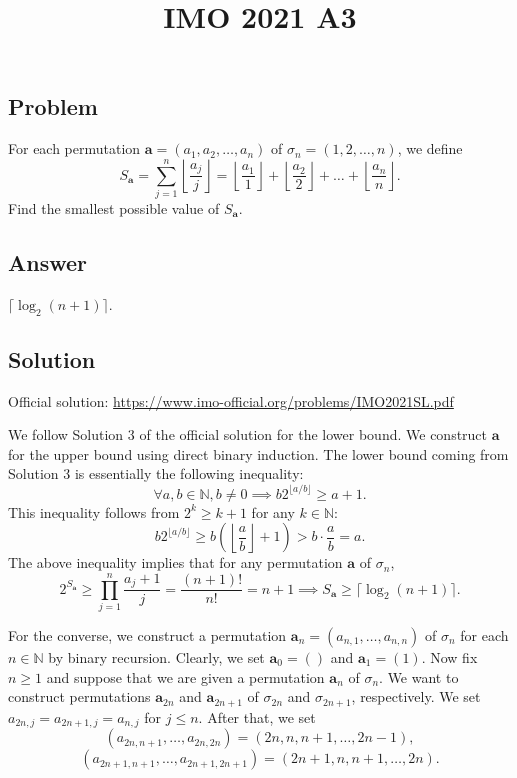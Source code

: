 \documentclass{article}
\title{IMO 2021 A3}
\author{}
\date{}
\newcommand{\N}{\mathbb{N}}
\begin{document}
\maketitle



\subsection*{Problem}

For each permutation $\mathbf{a} = (a_1, a_2, \ldots, a_n)$ of $\sigma_n = (1, 2, \ldots, n)$, we define
\[ S_{\mathbf{a}} = \sum_{j = 1}^n \left\lfloor \frac{a_j}{j} \right\rfloor = \left\lfloor \frac{a_1}{1} \right\rfloor + \left\lfloor \frac{a_2}{2} \right\rfloor + \ldots + \left\lfloor \frac{a_n}{n} \right\rfloor. \]
Find the smallest possible value of $S_{\mathbf{a}}$.



\subsection*{Answer}

$\lceil \log_2 (n + 1) \rceil$.



\subsection*{Solution}

Official solution: \url{https://www.imo-official.org/problems/IMO2021SL.pdf}

We follow Solution 3 of the official solution for the lower bound.
We construct $\mathbf{a}$ for the upper bound using direct binary induction.
The lower bound coming from Solution 3 is essentially the following inequality:
\[ \forall a, b \in \N, b \neq 0 \implies b 2^{\lfloor a/b \rfloor} \geq a + 1. \]
This inequality follows from $2^k \geq k + 1$ for any $k \in \N$:
\[ b 2^{\lfloor a/b \rfloor} \geq b\left(\left\lfloor \frac{a}{b} \right\rfloor + 1\right) > b \cdot \frac{a}{b} = a. \]
The above inequality implies that for any permutation $\mathbf{a}$ of $\sigma_n$,
\[ 2^{S_{\mathbf{a}}} \geq \prod_{j = 1}^n \frac{a_j + 1}{j} = \frac{(n + 1)!}{n!} = n + 1 \implies S_{\mathbf{a}} \geq \lceil \log_2 (n + 1) \rceil. \]

For the converse, we construct a permutation $\mathbf{a}_n = (a_{n, 1}, \ldots, a_{n, n})$ of $\sigma_n$ for each $n \in \N$ by binary recursion.
Clearly, we set $\mathbf{a}_0 = ()$ and $\mathbf{a}_1 = (1)$.
Now fix $n \geq 1$ and suppose that we are given a permutation $\mathbf{a}_n$ of $\sigma_n$.
We want to construct permutations $\mathbf{a}_{2n}$ and $\mathbf{a}_{2n + 1}$ of $\sigma_{2n}$ and $\sigma_{2n + 1}$, respectively.
We set $a_{2n, j} = a_{2n + 1, j} = a_{n, j}$ for $j \leq n$.
After that, we set
\[ (a_{2n, n + 1}, \ldots, a_{2n, 2n}) = (2n, n, n + 1, \ldots, 2n - 1), \]
\[ (a_{2n + 1, n + 1}, \ldots, a_{2n + 1, 2n + 1}) = (2n + 1, n, n + 1, \ldots, 2n). \]
\end{document}
